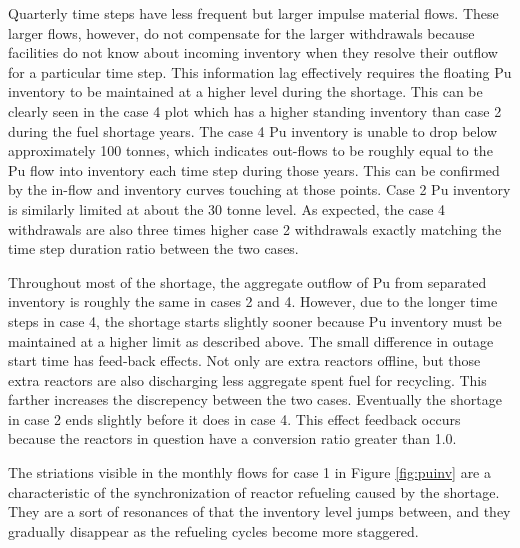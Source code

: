 \documentclass{style}
\begin{document}
Quarterly time steps have less frequent but larger impulse material flows.
These larger flows, however, do not compensate for the larger withdrawals
because facilities do not know about incoming inventory when they resolve
their outflow for a particular time step.  This information lag effectively
requires the floating Pu inventory to be maintained at a higher level during
the shortage.  This can be clearly seen in the case 4 plot which has a higher
standing inventory than case 2 during the fuel shortage years.  The case 4 Pu
inventory is unable to drop below approximately 100 tonnes, which indicates
out-flows to be roughly equal to the Pu flow into inventory each time step
during those years.  This can be confirmed by the in-flow and inventory curves
touching at those points.  Case 2 Pu inventory is similarly limited at about
the 30 tonne level.  As expected, the case 4 withdrawals are also three times
higher case 2 withdrawals exactly matching the time step duration ratio
between the two cases.

Throughout most of the shortage, the aggregate outflow of Pu from separated
inventory is roughly the same in cases 2 and 4.  However, due to the longer
time steps in case 4, the shortage starts slightly sooner because Pu inventory
must be maintained at a higher limit as described above.  The small difference
in outage start time has feed-back effects.  Not only are extra reactors
offline, but those extra reactors are also discharging less aggregate spent
fuel for recycling.  This farther increases the discrepency between the two
cases. Eventually the shortage in case 2 ends slightly before it does in case
4. This effect feedback occurs because the reactors in question have a
conversion ratio greater than 1.0.

The striations visible in the monthly flows for case 1 in Figure
\ref{fig:puinv} are a characteristic of the synchronization of reactor
refueling caused by the shortage.  They are a sort of resonances of that the
inventory level jumps between, and they gradually disappear as the refueling
cycles become more staggered.
\end{document}
